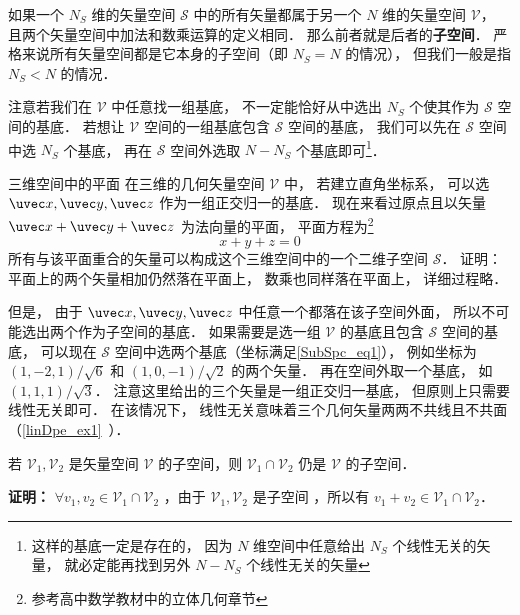 

如果一个 $N_S$ 维的矢量空间 $\mathcal S$ 中的所有矢量都属于另一个 $N$ 维的矢量空间 $\mathcal V$， 且两个矢量空间中加法和数乘运算的定义相同． 那么前者就是后者的\textbf{子空间}． 严格来说所有矢量空间都是它本身的子空间（即 $N_S = N$ 的情况）， 但我们一般是指 $N_S < N$ 的情况．

注意若我们在 $\mathcal V$ 中任意找一组基底， 不一定能恰好从中选出 $N_S$ 个使其作为 $\mathcal S$ 空间的基底． 若想让 $\mathcal V$ 空间的一组基底包含 $\mathcal S$ 空间的基底， 我们可以先在 $\mathcal S$ 空间中选 $N_S$ 个基底， 再在 $\mathcal S$ 空间外选取 $N - N_S$ 个基底即可\footnote{这样的基底一定是存在的， 因为 $N$ 维空间中任意给出 $N_S$ 个线性无关的矢量， 就必定能再找到另外 $N - N_S$ 个线性无关的矢量}．

\begin{example}{三维空间中的平面}
在三维的几何矢量空间 $\mathcal V$ 中， 若建立直角坐标系， 可以选 $\uvec x, \uvec y, \uvec z$ 作为一组正交归一的基底． 现在来看过原点且以矢量 $\uvec x + \uvec y + \uvec z$ 为法向量的平面， 平面方程为\footnote{参考高中数学教材中的立体几何章节}
\begin{equation}\label{SubSpc_eq1}
x + y + z = 0
\end{equation}
所有与该平面重合的矢量可以构成这个三维空间中的一个二维子空间 $\mathcal S$． 证明： 平面上的两个矢量相加仍然落在平面上， 数乘也同样落在平面上， 详细过程略． 

但是， 由于 $\uvec x, \uvec y, \uvec z$ 中任意一个都落在该子空间外面， 所以不可能选出两个作为子空间的基底． 如果需要是选一组 $\mathcal V$ 的基底且包含 $\mathcal S$ 空间的基底， 可以现在 $\mathcal S$ 空间中选两个基底（坐标满足\autoref{SubSpc_eq1}）， 例如坐标为 $(1, -2, 1)/\sqrt{6}$ 和 $(1, 0, -1)/\sqrt{2}$ 的两个矢量． 再在空间外取一个基底， 如 $(1, 1, 1)/\sqrt{3}$． 注意这里给出的三个矢量是一组正交归一基底， 但原则上只需要线性无关即可． 在该情况下， 线性无关意味着三个几何矢量两两不共线且不共面（\autoref{linDpe_ex1}~）．
\end{example}
\begin{theorem}{}
若 $\mathcal V_1,\mathcal V_2$ 是矢量空间 $\mathcal V$ 的子空间，则 $\mathcal V_1\cap\mathcal V_2$ 仍是 $\mathcal V$ 的子空间．
\end{theorem}
\textbf{证明：}  $\forall v_1,v_2\in\mathcal V_1\cap\mathcal V_2$ ，由于 $\mathcal V_1,\mathcal V_2$ 是子空间 ，所以有 $v_1+v_2\in\mathcal V_1\cap \mathcal V_2$．


